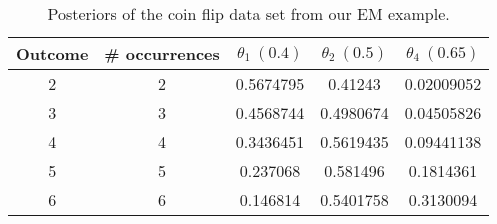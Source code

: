 \begin{table}
\center
\begin{tabular}{|c|c|c|c|c|}
\hline
Outcome & \# occurrences	& $ \theta_{1}~(0.4) $ 	& $ \theta_{2}~(0.5) $ 	& $ \theta_{4}~(0.65) $ \\
\hline
2		& 2				& 0.5674795				& 0.41243				& 0.02009052				\\
3		& 3				& 0.4568744				& 0.4980674				& 0.04505826				\\
4		& 4				& 0.3436451				& 0.5619435				& 0.09441138				\\
5		& 5				& 0.237068				& 0.581496				& 0.1814361				\\
6		& 6				& 0.146814				& 0.5401758				& 0.3130094				\\
\hline
\end{tabular}
\caption{Posteriors of the coin flip data set from our EM example.}
\label{tab:posteriors}
\end{table}




